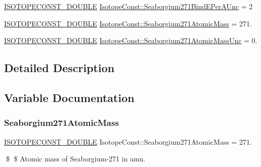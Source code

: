 \begin{DoxyCompactItemize}
\mbox{\hyperlink{group___isotope_const-_macros_ga8f45a7272ce02c0b4c65c44636ed719a}{I\+S\+O\+T\+O\+P\+E\+C\+O\+N\+S\+T\+\_\+\+D\+O\+U\+B\+LE}} \mbox{\hyperlink{group___isotope_const-_seaborgium-_sg271_gae415bbad86a2a38197c3c2dee0838631}{Isotope\+Const\+::\+Seaborgium271\+Bind\+E\+Per\+A\+Unc}} = 2
\item 
\mbox{\hyperlink{group___isotope_const-_macros_ga8f45a7272ce02c0b4c65c44636ed719a}{I\+S\+O\+T\+O\+P\+E\+C\+O\+N\+S\+T\+\_\+\+D\+O\+U\+B\+LE}} \mbox{\hyperlink{group___isotope_const-_seaborgium-_sg271_ga0d60de35bc5e3bd8f878e10acf03720c}{Isotope\+Const\+::\+Seaborgium271\+Atomic\+Mass}} = 271.
\item 
\mbox{\hyperlink{group___isotope_const-_macros_ga8f45a7272ce02c0b4c65c44636ed719a}{I\+S\+O\+T\+O\+P\+E\+C\+O\+N\+S\+T\+\_\+\+D\+O\+U\+B\+LE}} \mbox{\hyperlink{group___isotope_const-_seaborgium-_sg271_gae5da2b30d7020dd911e653d83adef1fd}{Isotope\+Const\+::\+Seaborgium271\+Atomic\+Mass\+Unc}} = 0.
\end{DoxyCompactItemize}


\subsection{Detailed Description}


\subsection{Variable Documentation}
\mbox{\label{group___isotope_const-_seaborgium-_sg271_ga0d60de35bc5e3bd8f878e10acf03720c}} 
\subsubsection{\texorpdfstring{Seaborgium271\+Atomic\+Mass}{Seaborgium271AtomicMass}}
{\footnotesize\ttfamily \mbox{\hyperlink{group___isotope_const-_macros_ga8f45a7272ce02c0b4c65c44636ed719a}{I\+S\+O\+T\+O\+P\+E\+C\+O\+N\+S\+T\+\_\+\+D\+O\+U\+B\+LE}} Isotope\+Const\+::\+Seaborgium271\+Atomic\+Mass = 271.}

\$ \$ Atomic mass of Seaborgium-\/271 in amu. \mbox{\label{group___isotope_const-_seaborgium-_sg271_gae5da2b30d7020dd911e653d83adef1fd}} 
